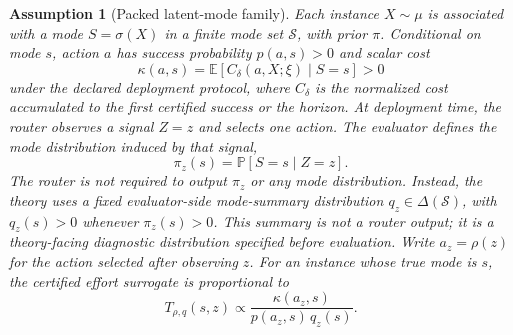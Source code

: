 \documentclass{article}
\newtheorem{assumption}{Assumption}
\newtheorem{definition}{Definition}
\newcommand{\cS}{\mathcal{S}}
\newcommand{\E}{\mathbb{E}}
\newcommand{\Prb}{\mathbb{P}}
\begin{document}




\begin{assumption}[Packed latent-mode family]
\label{ass:packed}
Each instance $X\sim\mu$ is associated with a mode $S=\sigma(X)$ in a finite mode set $\cS$, with prior $\pi$.
Conditional on mode $s$, action $a$ has success probability $p(a,s)>0$ and scalar cost
\[
\kappa(a,s)=\E[C_\delta(a,X;\xi)\mid S=s]>0
\]
under the declared deployment protocol, where $C_\delta$ is the normalized cost accumulated to the first certified success or the horizon.
At deployment time, the router observes a signal $Z=z$ and selects one action.
The evaluator defines the mode distribution induced by that signal,
\[
\pi_z(s)=\Prb[S=s\mid Z=z].
\]
The router is not required to output $\pi_z$ or any mode distribution.
Instead, the theory uses a fixed evaluator-side mode-summary distribution $q_z\in\Delta(\cS)$, with $q_z(s)>0$ whenever $\pi_z(s)>0$.
This summary is not a router output; it is a theory-facing diagnostic distribution specified before evaluation.
Write $a_z=\rho(z)$ for the action selected after observing $z$.
For an instance whose true mode is $s$, the certified effort surrogate is proportional to
\begin{equation}
  T_{\rho,q}(s,z) \propto \frac{\kappa(a_z,s)}{p(a_z,s)\,q_z(s)} .
  \label{eq:effort-surrogate}
\end{equation}
\end{assumption}
\end{document}
